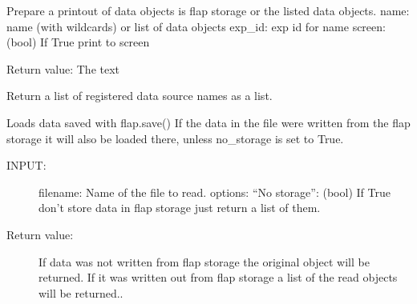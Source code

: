 \documentclass[letterpaper,10pt,english]{sphinxmanual}
\begin{document}

\begin{fulllineitems}
\label{\detokenize{data_object:flap.data_object.list_data_objects}}
Prepare a printout of data objects is flap storage or the listed data objects.
name: name (with wildcards) or list of data objects
exp\_id: exp id for name
screen: (bool) If True print to screen

Return value: The text

\end{fulllineitems}


\begin{fulllineitems}
\label{\detokenize{data_object:flap.data_object.list_data_sources}}
Return a list of registered data source names as a list.

\end{fulllineitems}


\begin{fulllineitems}
\label{\detokenize{data_object:flap.data_object.load}}
Loads data saved with flap.save()
If the data in the file were written from the flap storage it will also be
loaded there, unless  no\_storage is set to True.
\begin{description}
\item[{INPUT:}] \leavevmode
filename: Name of the file to read.
options: “No storage”: (bool) If True don’t store data in flap storage just return a list of them.

\item[{Return value:}] \leavevmode
If data was not written from flap storage the original object will be returned.
If it was written out from flap storage a list of the read objects will be returned..

\end{description}

\end{fulllineitems}
\end{document}
